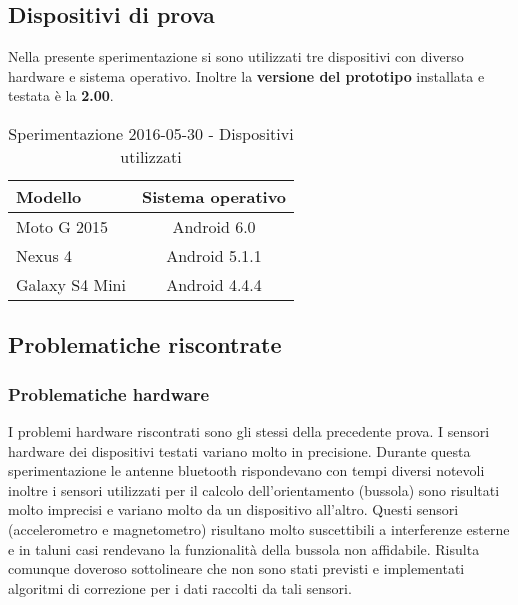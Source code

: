 \documentclass[../Sperimentazione.tex]{subfiles}
\begin{document}
		\subsection{Dispositivi di prova}
			Nella presente sperimentazione si sono utilizzati tre dispositivi con diverso hardware e sistema operativo. Inoltre la \textbf{versione del prototipo} installata e testata è la \textbf{2.00}.
	
			\begin{table} [h]
			\centering
				\begin{tabular}{lc}
					\textbf{Modello} & \textbf{Sistema operativo} \\
					\toprule
					 Moto G 2015 & Android 6.0 \\
					 \midrule
					 Nexus 4 & Android 5.1.1 \\
					 \midrule
					 Galaxy S4 Mini & Android 4.4.4 \\
					\bottomrule
				\end{tabular}
				\caption{Sperimentazione 2016-05-30 - Dispositivi utilizzati}
				\label{tab:Sperimentazione1Dispositivi}
			\end{table}
		
			
		\newpage
			
	
		\newpage
		\subsection{Problematiche riscontrate}
		
			\subsubsection{Problematiche hardware}
				I problemi hardware riscontrati sono gli stessi della precedente prova. I sensori hardware dei dispositivi testati variano molto in precisione. Durante questa sperimentazione le antenne bluetooth rispondevano con tempi diversi notevoli inoltre i sensori utilizzati per il calcolo dell'orientamento (bussola) sono risultati molto imprecisi e variano molto da un dispositivo all'altro. Questi sensori (accelerometro e magnetometro) risultano molto suscettibili a interferenze esterne e in taluni casi rendevano la funzionalità della bussola non affidabile. Risulta comunque doveroso sottolineare che non sono stati previsti e implementati algoritmi di correzione per i dati raccolti da tali sensori.
		
\end{document}
